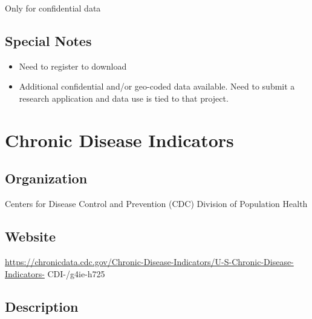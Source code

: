 \documentclass[
]{book}
\providecommand{\tightlist}{%
  \setlength{\itemsep}{0pt}\setlength{\parskip}{0pt}}
\begin{document}
Only for confidential data

\hypertarget{special-notes-15}{%
\section{Special Notes}\label{special-notes-15}}

\begin{itemize}
\tightlist
\item
  Need to register to download
\item
  Additional confidential and/or geo-coded data available. Need to submit a research application and data use is tied to that project.
\end{itemize}

\mainmatter

\hypertarget{chronic-disease-indicators}{%
\chapter{Chronic Disease Indicators}\label{chronic-disease-indicators}}

\hypertarget{organization-16}{%
\section{Organization}\label{organization-16}}

Centers for Disease Control and Prevention (CDC) Division of Population Health

\hypertarget{website-16}{%
\section{Website}\label{website-16}}

\url{https://chronicdata.cdc.gov/Chronic-Disease-Indicators/U-S-Chronic-Disease-Indicators-} CDI-/g4ie-h725

\hypertarget{description-16}{%
\section{Description}\label{description-16}}
\end{document}
